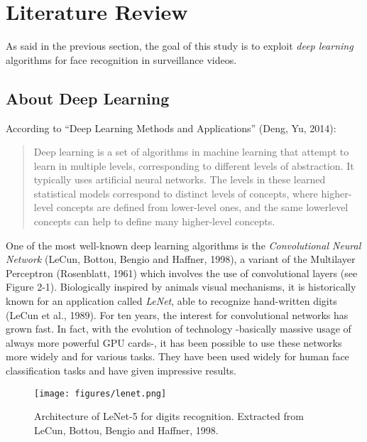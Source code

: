 \setlength{\footskip}{8mm}

\chapter{Literature Review} 
\protect\label{ch:literature-review}

As said in the previous section, the goal of this study is to exploit \textit{deep learning} algorithms for face recognition in surveillance videos.

\section{About Deep Learning}
\protect\label{Main-keywords-of-the-topic}
According to \enquote{Deep Learning Methods and Applications} (Deng, Yu, 2014):

\blockquote{Deep learning is a set of algorithms in machine
learning that attempt to learn in multiple levels, corresponding
to different levels of abstraction. It typically uses artificial
neural networks. The levels in these learned statistical models
correspond to distinct levels of concepts, where higher-level concepts
are defined from lower-level ones, and the same lowerlevel
concepts can help to define many higher-level concepts.}

One of the most well-known deep learning algorithms is the \textit{Convolutional Neural Network} (LeCun, Bottou, Bengio and Haffner, 1998), a variant of the Multilayer Perceptron (Rosenblatt, 1961) which involves the use of convolutional layers (see Figure 2-1). Biologically inspired by animals visual mechanisms, it is historically known for an application called \textit{LeNet}, able to recognize hand-written digits (LeCun et al., 1989). For ten years, the interest for convolutional networks has grown fast. In fact, with the evolution of technology -basically massive usage of always more powerful GPU cards-, it has been possible to use these networks more widely and for various tasks. They have been used widely for human face classification tasks and have given impressive results.

\begin{figure}[!ht]
  \centering
  \texttt{[image: figures/lenet.png]}  
  \caption[Architecture of LeNet-5 for digits recognition. Extracted from LeCun, Bottou, Bengio and Haffner, 1998.]{Architecture of LeNet-5 for digits recognition. Extracted from LeCun, Bottou, Bengio and Haffner, 1998.}
  \protect\label{fig:lenet}
\end{figure}

